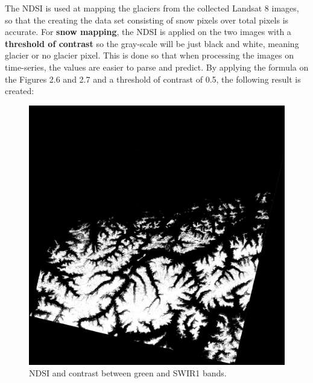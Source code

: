 \documentclass[12pt, a4paper]{report}
\begin{document}
	The NDSI is used at mapping the glaciers from the collected Landsat 8 images, so that the creating the data set consisting of snow pixels over total pixels is accurate. For \textbf{snow mapping}, the NDSI is applied on the two images with a \textbf{threshold of contrast} so the gray-scale will be just black and white, meaning glacier or no glacier pixel. This is done so that when processing the images on time-series, the values are easier to parse and predict. By applying the formula on the Figures 2.6 and 2.7 and a threshold of contrast of 0.5, the following result is created:
	\begin{figure}[H]
		\centering
		\includegraphics[scale=1]{result(2).png}
		\caption{NDSI and contrast between green and SWIR1 bands.}
		\label{fig:ndsi}
	\end{figure}
	
\end{document}
